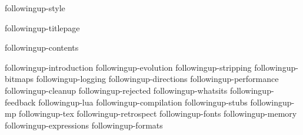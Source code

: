 \environment followingup-style

\dontcomplain

\startdocument

    \component followingup-titlepage

    \startfrontmatter
        \component followingup-contents
    \stopfrontmatter

    \startbodymatter
        \component followingup-introduction
        \component followingup-evolution
        \component followingup-stripping
        \component followingup-bitmaps
        \component followingup-logging
        \component followingup-directions
        \component followingup-performance
        \component followingup-cleanup
        \component followingup-rejected
        \component followingup-whatsits
        \component followingup-feedback
        \component followingup-lua
        \component followingup-compilation
        \component followingup-stubs
        \component followingup-mp
        \component followingup-tex
        \component followingup-retrospect
        \component followingup-fonts
        \component followingup-memory
        \component followingup-expressions
        \component followingup-formats
    \stopbodymatter

\stopdocument

